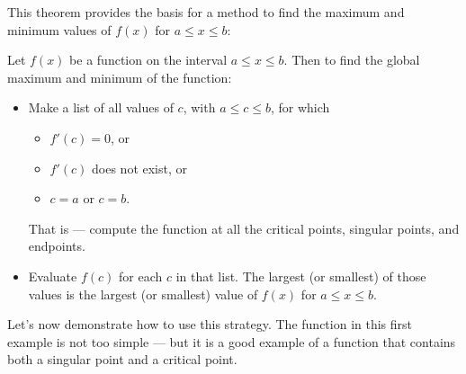 This theorem provides the basis for a method to find the maximum and
minimum values of $f(x)$ for $a\le x\le b$:
\begin{cor}\label{cor find maxmin}
 Let $f(x)$ be a function on the interval $a \leq x \leq b$. Then to find the global
maximum and minimum of the function:
\begin{itemize}
\item Make a list of all values of $c$, with $a\le c\le b$, for which
      \begin{itemize}
          \item $f'(c)=0$, or
          \item $f'(c)$ does not exist, or
          \item $c=a$ or $c=b$.
      \end{itemize}
  That is --- compute the function at all the critical points, singular points, and
endpoints.

\item Evaluate $f(c)$ for each $c$ in that list. The largest (or smallest)
      of those values is the largest (or smallest) value of $f(x)$
      for $a\le x\le b$.
\end{itemize}
\end{cor}
Let's now demonstrate how to use this strategy. The function in  this first example is
not too simple --- but it is a good example of a function that contains both a
singular point and a critical point.
